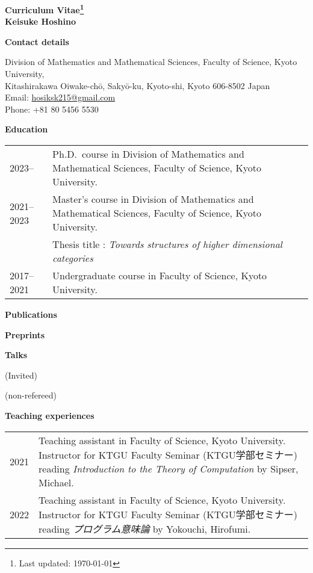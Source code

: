 \documentclass[a4paper,dvipsnames,11pt,backend=luatex]{article} %
\newcommand*{\cvsection}[1]{%
  \vspace{1.2\baselineskip}%
  {\raggedright          %
   \bfseries\large       %
   #1\par}               %
  \vspace{0.4\baselineskip}%
}
\begin{document}
\begin{center}\large\bfseries Curriculum Vitae\footnote{Last updated: \today}
\\
\rm Keisuke Hoshino
\end{center}
\noindent %
\cvsection{Contact details}
\vspace{-1em}%
\noindent %
Division of Mathematics and Mathematical Sciences, Faculty of Science, Kyoto University,
\\
Kitashirakawa Oiwake-chō, Sakyō-ku, Kyoto-shi,
Kyoto 606-8502  
Japan
\\
Email: \href{mailto:hosiksk215@gmail.com}{hosiksk215@gmail.com}
\\
Phone: +81 80 5456 5530


\cvsection{Education}
\begin{tabularx}{\textwidth}{@{}lp{140mm}}
  2023--
  &
  Ph.D.\ course in Division of Mathematics and Mathematical Sciences, Faculty of Science, Kyoto University.
  \\
  2021--2023
  &
  Master's course in Division of Mathematics and Mathematical Sciences, Faculty of Science, Kyoto University.
  \\&
  Thesis title : \textit{Towards structures of higher dimensional categories}
  \\
  2017--2021
  &
  Undergraduate course in Faculty of Science, Kyoto University.
\end{tabularx}

\cvsection{Publications}
\begin{refsection}                      %
  \nocite{*} %
  \printbibliography[heading=none,keyword=published,resetnumbers=true]
\end{refsection}

\cvsection{Preprints}
\begin{refsection}
\nocite{*} %
  \printbibliography[heading=none,keyword=preprint,resetnumbers=true]
\end{refsection}

\cvsection{Talks}
(Invited)
\begin{refsection}
\nocite{*} %
  \printbibliography[heading=none,keyword=iv-talk,resetnumbers=true]
\end{refsection}

(non-refereed)
\begin{refsection}
\nocite{*} %
  \printbibliography[heading=none,keyword=nr-talk,resetnumbers=true]
\end{refsection}

\pagebreak

\cvsection{Teaching experiences}
\begin{tabularx}{\textwidth}{@{}lp{140mm}}
  2021
  &
  Teaching assistant in Faculty of Science, Kyoto University.
  Instructor for KTGU Faculty Seminar (KTGU学部セミナー) reading \textit{Introduction to the Theory of Computation} by Sipser, Michael.
  \\
  2022
  &
  Teaching assistant in Faculty of Science, Kyoto University.
  Instructor for KTGU Faculty Seminar (KTGU学部セミナー) reading \textit{プログラム意味論} by Yokouchi, Hirofumi.
\end{tabularx}
\end{document}
